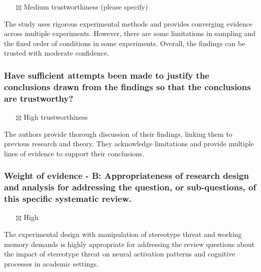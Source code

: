 \documentclass[
  doc, a4paper]{apa7}
\providecommand{\tightlist}{%
  \setlength{\itemsep}{0pt}\setlength{\parskip}{0pt}}
\begin{document}
\begin{itemize}
\tightlist
\item[$\boxtimes$]
  Medium trustworthiness (please specify)
\end{itemize}

The study uses rigorous experimental methods and provides converging evidence across multiple experiments. However, there are some limitations in sampling and the fixed order of conditions in some experiments. Overall, the findings can be trusted with moderate confidence.

\subsubsection{Have sufficient attempts been made to justify the conclusions drawn from the findings so that the conclusions are trustworthy?}\label{have-sufficient-attempts-been-made-to-justify-the-conclusions-drawn-from-the-findings-so-that-the-conclusions-are-trustworthy}

\begin{itemize}
\tightlist
\item[$\boxtimes$]
  High trustworthiness
\end{itemize}

The authors provide thorough discussion of their findings, linking them to previous research and theory. They acknowledge limitations and provide multiple lines of evidence to support their conclusions.

\subsubsection{Weight of evidence - B: Appropriateness of research design and analysis for addressing the question, or sub-questions, of this specific systematic review.}\label{weight-of-evidence---b-appropriateness-of-research-design-and-analysis-for-addressing-the-question-or-sub-questions-of-this-specific-systematic-review.}

\begin{itemize}
\tightlist
\item[$\boxtimes$]
  High
\end{itemize}

The experimental design with manipulation of stereotype threat and working memory demands is highly appropriate for addressing the review questions about the impact of stereotype threat on neural activation patterns and cognitive processes in academic settings.
\end{document}
